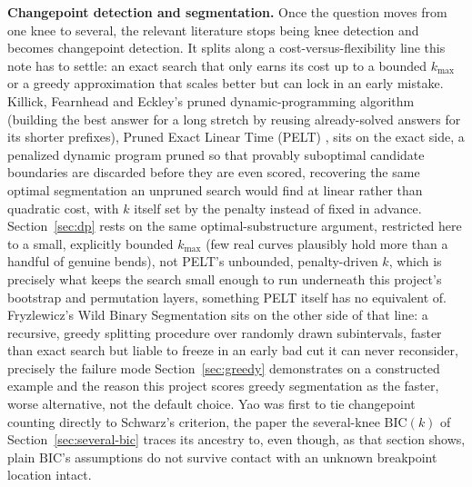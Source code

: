 \documentclass[11pt]{article}
\begin{document}
\textbf{Changepoint detection and segmentation.} Once the question moves
from one knee to several, the relevant literature stops being knee
detection and becomes changepoint detection. It splits along a
cost-versus-flexibility line this note has to settle: an exact search
that only earns its cost up to a bounded $k_{\max}$ or a greedy
approximation that scales better but can lock in an early mistake.
Killick, Fearnhead and Eckley's pruned dynamic-programming algorithm
(building the best answer for a long stretch by reusing already-solved
answers for its shorter prefixes), Pruned Exact Linear Time (PELT)
\citep{killick2012}, sits on the exact side, a penalized dynamic
program pruned so that provably suboptimal candidate boundaries are
discarded before they are even scored, recovering the same optimal
segmentation an unpruned search would find at linear rather than
quadratic cost, with $k$ itself set by the penalty instead of fixed in
advance. Section~\ref{sec:dp} rests on the same optimal-substructure
argument, restricted here to a small, explicitly bounded $k_{\max}$
(few real curves plausibly hold more than a handful of genuine bends),
not PELT's unbounded, penalty-driven $k$, which is precisely what keeps
the search small enough to run underneath this project's bootstrap and
permutation layers, something PELT itself has no equivalent of.
Fryzlewicz's Wild Binary Segmentation \citep{fryzlewicz2014} sits on
the other side of that line: a recursive, greedy splitting procedure
over randomly drawn subintervals, faster than exact search but liable
to freeze in an early bad cut it can never reconsider, precisely the
failure mode Section~\ref{sec:greedy} demonstrates on a constructed
example and the reason this project scores greedy segmentation as the
faster, worse alternative, not the default choice. Yao \citep{yao1988} was first to tie changepoint counting
directly to Schwarz's criterion, the paper the several-knee
$\mathrm{BIC}(k)$ of Section~\ref{sec:several-bic} traces its ancestry
to, even though, as that section shows, plain $\mathrm{BIC}$'s
assumptions do not survive contact with an unknown breakpoint location
intact.
\end{document}
